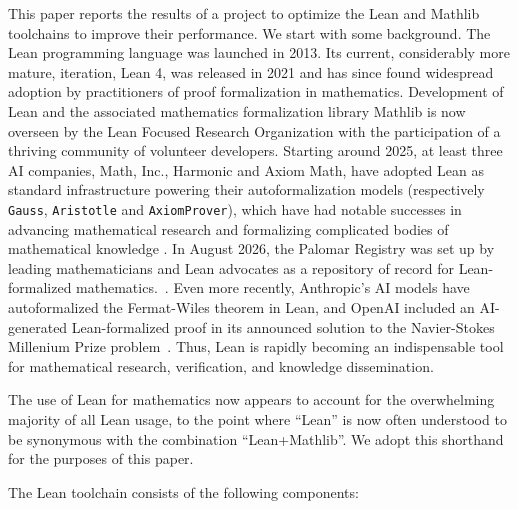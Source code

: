 \documentclass{article}
\newcommand{\Lean}{Lean\xspace}      %
\newcommand{\mathlib}{Mathlib\xspace}
\begin{document}
This paper reports the results of a project to optimize the \Lean and \mathlib toolchains to improve their performance. We start with some background. The \Lean programming language was launched in 2013. Its current, considerably more mature, iteration, Lean 4, was released in 2021 and has since found widespread adoption by practitioners of proof formalization in mathematics. Development of \Lean and the associated mathematics formalization library \mathlib is now overseen by the Lean Focused Research Organization \cite{fro} with the participation of a thriving community of volunteer developers. Starting around 2025, at least three AI companies, Math, Inc., Harmonic and Axiom Math, have adopted \Lean as standard infrastructure powering their autoformalization models (respectively \texttt{Gauss}, \texttt{Aristotle} and \texttt{AxiomProver}), which have had notable successes in advancing mathematical research and formalizing complicated bodies of mathematical knowledge \cite{fel,gauss,strongpnt,spherepacking,spherepacking-paper,aristotle,harmonic-imo,axiom}. In August 2026, the Palomar Registry was set up by leading mathematicians and \Lean advocates as a repository of record for \Lean-formalized mathematics.~\cite{palomar}. Even more recently, Anthropic's AI models have autoformalized the Fermat-Wiles theorem in \Lean \cite{anthropic-flt}, and OpenAI included an AI-generated \Lean-formalized proof in its announced solution to the Navier-Stokes Millenium Prize problem~\cite{openai-navier-stokes}. Thus, \Lean is rapidly becoming an indispensable tool for mathematical research, verification, and knowledge dissemination.

The use of \Lean for mathematics now appears to account for the overwhelming majority of all \Lean usage, to the point where ``\Lean'' is now often understood to be synonymous with the combination ``\Lean{}+\mathlib''. We adopt this shorthand for the purposes of this paper.

The \Lean toolchain consists of the following components:
\end{document}
